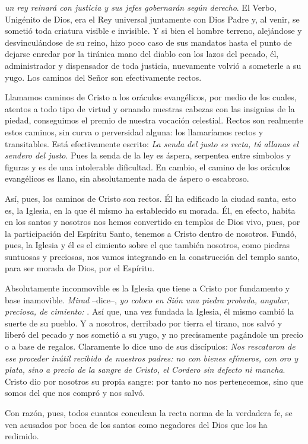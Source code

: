 \begin{body}
 \textit{un rey reinará con justicia y sus jefes gobernarán según derecho}. El Verbo, Unigénito de Dios, era el Rey universal juntamente con Dios Padre y, al venir, se sometió toda criatura visible e invisible. Y si bien el hombre terreno, alejándose y desvinculándose de su reino, hizo poco caso de sus mandatos hasta el punto de dejarse enredar por la tiránica mano del diablo con los lazos del pecado, él, administrador y dispensador de toda justicia, nuevamente volvió a someterle a su yugo. Los caminos del Señor son efectivamente rectos.

Llamamos caminos de Cristo a los oráculos evangélicos, por medio de los cuales, atentos a todo tipo de virtud y ornando nuestras cabezas con las insignias de la piedad, conseguimos el premio de nuestra vocación celestial. Rectos son realmente estos caminos, sin curva o perversidad alguna: los llamaríamos rectos y transitables. Está efectivamente escrito: \textit{La senda del justo es recta, tú allanas el sendero del justo}. Pues la senda de la ley es áspera, serpentea entre símbolos y figuras y es de una intolerable dificultad. En cambio, el camino de los oráculos evangélicos es llano, sin absolutamente nada de áspero o escabroso.

Así, pues, los caminos de Cristo son rectos. Él ha edificado la ciudad santa, esto es, la Iglesia, en la que él mismo ha establecido su morada. Él, en efecto, habita en los santos y nosotros nos hemos convertido en templos de Dios vivo, pues, por la participación del Espíritu Santo, tenemos a Cristo dentro de nosotros. Fundó, pues, la Iglesia y él es el cimiento sobre el que también nosotros, como piedras suntuosas y preciosas, nos vamos integrando en la construcción del templo santo, para ser morada de Dios, por el Espíritu.

Absolutamente inconmovible es la Iglesia que tiene a Cristo por fundamento y base inamovible. \textit{Mirad }–dice–, \textit{yo coloco en Sión una piedra probada, angular, preciosa, de cimiento: }. Así que, una vez fundada la Iglesia, él mismo cambió la suerte de su pueblo. Y a nosotros, derribado por tierra el tirano, nos salvó y liberó del pecado y nos sometió a su yugo, y no precisamente pagándole un precio o a base de regalos. Claramente lo dice uno de sus discípulos: \textit{Nos rescataron de ese proceder inútil recibido de nuestros padres: no con bienes efímeros, con oro y plata, sino a precio de la sangre de Cristo, el Cordero sin defecto ni mancha}. Cristo dio por nosotros su propia sangre: por tanto no nos pertenecemos, sino que somos del que nos compró y nos salvó.

Con razón, pues, todos cuantos conculcan la recta norma de la verdadera fe, se ven acusados por boca de los santos como negadores del Dios que los ha redimido.
\end{body}

